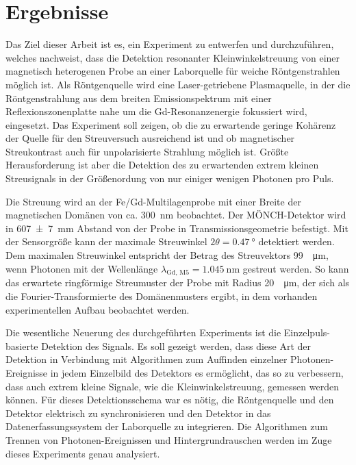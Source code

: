 \chapter{Ergebnisse}
\label{text:auswertung}
Das Ziel dieser Arbeit ist es, ein Experiment zu entwerfen und durchzuführen, welches nachweist, dass die Detektion resonanter Kleinwinkelstreuung von einer magnetisch heterogenen Probe an einer Laborquelle für weiche Röntgenstrahlen möglich ist. Als Röntgenquelle wird eine Laser-getriebene Plasmaquelle, in der die Röntgenstrahlung aus dem breiten Emissionspektrum mit einer Reflexionszonenplatte nahe um die Gd-Resonanzenergie fokussiert wird, eingesetzt. Das Experiment soll zeigen, ob die zu erwartende geringe Kohärenz der Quelle für den Streuversuch ausreichend ist und ob magnetischer Streukontrast auch für unpolarisierte Strahlung möglich ist. Größte Herausforderung ist aber die Detektion des zu erwartenden extrem kleinen Streusignals in der Größenordung von nur einiger wenigen Photonen pro Puls.

\noindent
Die Streuung wird an der Fe/Gd-Multilagenprobe mit einer Breite der magnetischen Domänen von ca. \SI{300}{\nano\meter} beobachtet. Der MÖNCH-Detektor wird in \SI{607(7)}{\milli\meter} Abstand von der Probe in Transmissionsgeometrie befestigt. Mit der  Sensorgröße kann der maximale Streuwinkel $2\theta = \SI{0.47}{\degree}$ detektiert werden. Dem maximalen Streuwinkel entspricht der Betrag des Streuvektors \SI{99}{\per\micro\meter}, wenn Photonen mit der Wellenlänge $\lambda_\text{Gd, M5} = \SI{1.045}{\nano\meter}$ gestreut werden. So kann das erwartete ringförmige Streumuster der Probe mit Radius \SI{20}{\per\micro\meter}, der sich als die Fourier-Transformierte des Domänenmusters ergibt, in dem vorhanden experimentellen Aufbau beobachtet werden.

\noindent
Die wesentliche Neuerung des durchgeführten Experiments ist die Einzelpuls-basierte Detektion des Signals. Es soll gezeigt werden, dass diese Art der Detektion in Verbindung mit Algorithmen zum Auffinden einzelner Photonen-Ereignisse in jedem Einzelbild des Detektors es ermöglicht, das  so zu verbessern, dass auch extrem kleine Signale, wie die Kleinwinkelstreuung, gemessen werden können. Für dieses Detektionsschema war es nötig, die Röntgenquelle und den Detektor elektrisch zu synchronisieren und den Detektor in das Datenerfassungssystem der Laborquelle zu integrieren. Die Algorithmen zum Trennen von Photonen-Ereignissen und Hintergrundrauschen werden im Zuge dieses Experiments genau analysiert.

